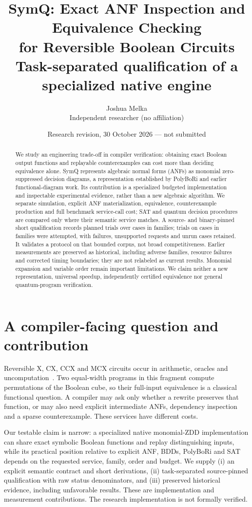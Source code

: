 \documentclass[10pt,a4paper]{article}
\title{SymQ: Exact ANF Inspection and Equivalence Checking\\
for Reversible Boolean Circuits\\
\large Task-separated qualification of a specialized native engine}
\author{Joshua Melka\\\small Independent researcher (no affiliation)}
\date{Research revision, 30 October 2026 --- not submitted}
\begin{document}
\maketitle

\begin{abstract}
We study an engineering trade-off in compiler verification: obtaining exact Boolean output
functions and replayable counterexamples can cost more than deciding equivalence alone.
SymQ represents algebraic normal forms (ANFs) as monomial zero-suppressed decision diagrams,
a representation established by PolyBoRi and earlier functional-diagram work. Its contribution
is a specialized budgeted implementation and inspectable experimental evidence, rather than
a new algebraic algorithm. We separate simulation, explicit ANF materialization, equivalence,
counterexample production and full benchmark service-call cost; SAT and quantum decision procedures are
compared only where their semantic service matches. A source- and binary-pinned short
qualification records \QualTrials{} planned trials over \QualCases{} cases in
\QualFamilies{} families; \QualRunTrials{} trials on \QualRunCases{} cases in
\QualRunFamilies{} families were attempted, with failures, unsupported requests and unrun
cases retained. It validates
a protocol on that bounded corpus, not broad competitiveness. Earlier measurements are
preserved as historical, including adverse families, resource failures and corrected timing
boundaries; they are not relabeled as current results. Monomial expansion and variable order
remain important limitations. We claim neither a new representation, universal speedup,
independently certified equivalence nor general quantum-program verification.
\end{abstract}

\section{A compiler-facing question and contribution}
Reversible X, CX, CCX and MCX circuits occur in arithmetic, oracles and
uncomputation~\cite{wille2008revlib,gidney2018halving}. Two equal-width programs in this
fragment compute permutations of the Boolean cube, so their full-input equivalence is a
classical functional question. A compiler may ask only whether a rewrite preserves that
function, or may also need explicit intermediate ANFs, dependency inspection and a sparse
counterexample. These services have different costs.

Our testable claim is narrow: a specialized native monomial-ZDD implementation can share
exact symbolic Boolean functions and replay distinguishing inputs, while its practical
position relative to explicit ANF, BDDs, PolyBoRi and SAT depends on the requested service,
family, order and budget. We supply (i) an explicit semantic contract and short derivations,
(ii) task-separated source-pinned qualification with raw status denominators, and
(iii) preserved historical evidence, including unfavorable results. These are implementation
and measurement contributions. The research implementation is not formally verified.
\end{document}
